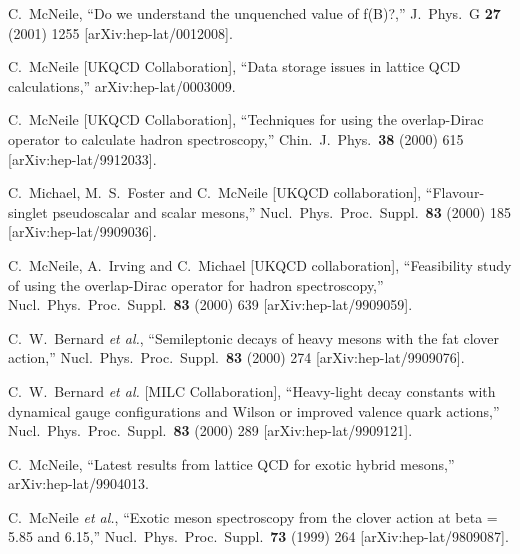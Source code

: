 \begin{thebibliography}{130}
C.~McNeile,
``Do we understand the unquenched value of f(B)?,''
J.\ Phys.\ G {\bf 27} (2001) 1255
[arXiv:hep-lat/0012008].


C.~McNeile  [UKQCD Collaboration],
``Data storage issues in lattice QCD calculations,''
arXiv:hep-lat/0003009.

C.~McNeile  [UKQCD Collaboration],
``Techniques for using the overlap-Dirac operator to calculate hadron  spectroscopy,''
Chin.\ J.\ Phys.\  {\bf 38} (2000) 615
[arXiv:hep-lat/9912033].

C.~Michael, M.~S.~Foster and C.~McNeile  [UKQCD collaboration],
``Flavour-singlet pseudoscalar and scalar mesons,''
Nucl.\ Phys.\ Proc.\ Suppl.\  {\bf 83} (2000) 185
[arXiv:hep-lat/9909036].

C.~McNeile, A.~Irving and C.~Michael  [UKQCD collaboration],
``Feasibility study of using the overlap-Dirac operator for hadron  spectroscopy,''
Nucl.\ Phys.\ Proc.\ Suppl.\  {\bf 83} (2000) 639
[arXiv:hep-lat/9909059].

C.~W.~Bernard {\it et al.},
``Semileptonic decays of heavy mesons with the fat clover action,''
Nucl.\ Phys.\ Proc.\ Suppl.\  {\bf 83} (2000) 274
[arXiv:hep-lat/9909076].

C.~W.~Bernard {\it et al.}  [MILC Collaboration],
``Heavy-light decay constants with dynamical gauge configurations and  Wilson or improved valence quark actions,''
Nucl.\ Phys.\ Proc.\ Suppl.\  {\bf 83} (2000) 289
[arXiv:hep-lat/9909121].

C.~McNeile,
``Latest results from lattice QCD for exotic hybrid mesons,''
arXiv:hep-lat/9904013.



C.~McNeile {\it et al.},
``Exotic meson spectroscopy from the clover action at beta = 5.85 and  6.15,''
Nucl.\ Phys.\ Proc.\ Suppl.\  {\bf 73} (1999) 264
[arXiv:hep-lat/9809087].


\end{thebibliography}
